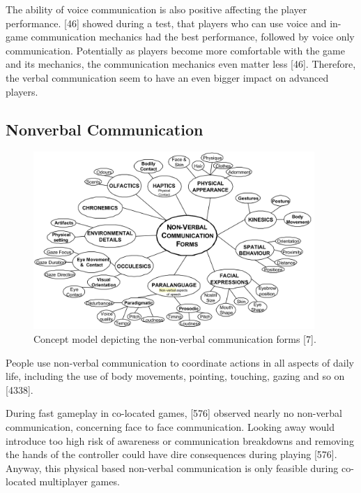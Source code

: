 The ability of voice communication is also positive affecting the player performance. \textcite{Vaddi2016Investigating2}[46] showed during a test, that players who can use voice and in-game communication mechanics had the best performance, followed by voice only communication. Potentially as players become more comfortable with the game and its mechanics, the communication mechanics even matter less \autocite{Vaddi2016Investigating2}[46]. Therefore, the verbal communication seem to have an even bigger impact on advanced players.




\subsection{Nonverbal Communication}
\label{section:Nonverbal Communication}

\begin{figure}
    \centering
    \includegraphics[width=0.95\textwidth]{images/non-verbal_communication_forms.png}
    \caption{ Concept model depicting the non-verbal communication forms \autocite{Manninen2002PlayerSession}[7]. }
    \label{fig:non-verbal communication forms}
\end{figure}

People use non-verbal communication to coordinate actions in all aspects of daily life, including the use of body movements, pointing, touching, gazing and so on \autocite{Leavitt2016PingGames}[4338].

During fast gameplay in co-located games, \textcite{Cheung2012CommunicationGaming}[576] observed nearly no non-verbal communication, concerning face to face communication.
Looking away would introduce too high  risk of awareness or communication breakdowns and removing the hands of the controller could have dire consequences during playing \autocite{Cheung2012CommunicationGaming}[576]. Anyway, this physical based non-verbal communication is only feasible during co-located multiplayer games.


